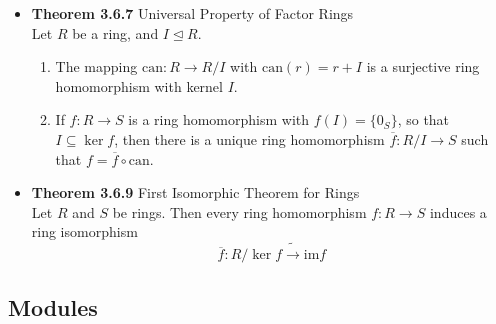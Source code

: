 \documentclass[11pt,a4paper]{article}
\begin{document}
\begin{itemize}
    \item \textbf{Theorem 3.6.7} Universal Property of Factor Rings \\
        Let $R$ be a ring, and $I \trianglelefteq R$.
        \begin{enumerate}
            \item The mapping $\mathrm{can}: R \to R / I$ with $\mathrm{can}(r) = r + I$
                is a surjective ring homomorphism with kernel $I$.
            \item If $f : R \to S$ is a ring homomorphism with $f(I) = \{0_S\}$,
                so that $I \subseteq \ker f$, then there is a unique ring homomorphism
                $\overline{f}: R / I \to S$ such that $f = \overline{f} \circ \mathrm{can}$.
        \end{enumerate}

    \item \textbf{Theorem 3.6.9} First Isomorphic Theorem for Rings \\
        Let $R$ and $S$ be rings.
        Then every ring homomorphism $f: R \to S$ induces a ring isomorphism
        \[
            \overline{f} : R / \ker f \tilde{\to} \mathrm{im} f
        \]

\end{itemize}

\subsection{Modules}
\end{document}
